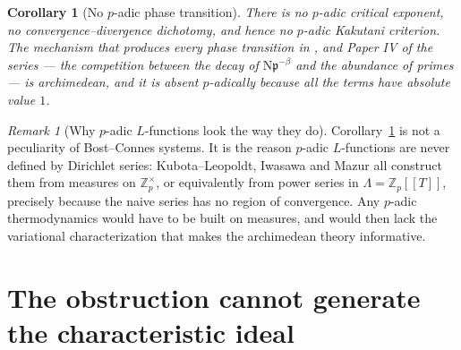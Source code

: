 \documentclass[11pt]{amsart}
\numberwithin{equation}{section}
\newtheorem{corollary}[theorem]{Corollary}
\theoremstyle{definition}
\theoremstyle{remark}
\newtheorem{remark}[theorem]{Remark}
\newcommand{\Z}{\mathbb{Z}}
\newcommand{\pp}{\mathfrak{p}}
\newcommand{\Ns}{\mathrm{N}}
\begin{document}
\begin{corollary}[No $p$-adic phase transition]\label{cor:nophase}
There is no $p$-adic critical exponent, no convergence--divergence dichotomy, and hence no
$p$-adic Kakutani criterion. The mechanism that produces every phase transition in
\cite{Main}, \cite{SeriesI} and Paper IV of the series --- the competition between the decay of
$\Ns\pp^{-\beta}$ and the abundance of primes --- is archimedean, and it is absent
$p$-adically because all the terms have absolute value $1$.
\end{corollary}

\begin{remark}[Why $p$-adic $L$-functions look the way they do]\label{rem:whymeasures}
Corollary~\ref{cor:nophase} is not a peculiarity of Bost--Connes systems. It is the reason
$p$-adic $L$-functions are never defined by Dirichlet series: Kubota--Leopoldt, Iwasawa
\cite{Iwasawa} and
Mazur all construct them from measures on $\Z_p^\times$, or equivalently from power series in
$\Lambda=\Z_p[[T]]$, precisely because the naive series has no region of convergence. Any
$p$-adic thermodynamics would have to be built on measures, and would then lack the
variational characterization that makes the archimedean theory informative.
\end{remark}

\section{The obstruction cannot generate the characteristic ideal}
\end{document}
